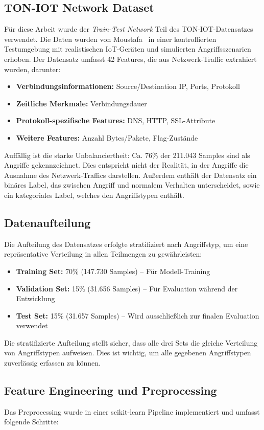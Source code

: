 \documentclass[12pt,oneside]{article}
\begin{document}
	\subsection{TON-IOT Network Dataset}
	Für diese Arbeit wurde der \textit{Train-Test Network} Teil des TON-IOT-Datensatzes verwendet. Die Daten wurden von Moustafa~\cite{moustafa2021} in einer kontrollierten Testumgebung mit realistischen IoT-Geräten und simulierten Angriffsszenarien erhoben. Der Datensatz umfasst 42 Features, die aus Netzwerk-Traffic extrahiert wurden, darunter:
	\begin{itemize}
		\item \textbf{Verbindungsinformationen:} Source/Destination IP, Ports, Protokoll
		\item \textbf{Zeitliche Merkmale:} Verbindungsdauer
		\item \textbf{Protokoll-spezifische Features:} DNS, HTTP, SSL-Attribute
		\item \textbf{Weitere Features:} Anzahl Bytes/Pakete, Flag-Zustände
	\end{itemize}
	Auffällig ist die starke Unbalanciertheit: Ca. 76\% der 211.043 Samples sind als Angriffe gekennzeichnet. Dies entspricht nicht der Realität, in der Angriffe die Ausnahme des  Netzwerk-Traffics darstellen. Außerdem enthält der Datensatz ein binäres Label, das zwischen Angriff und normalem Verhalten unterscheidet, sowie ein kategoriales Label, welches den Angriffstypen enthält. 
	\subsection{Datenaufteilung}
	Die Aufteilung des Datensatzes erfolgte stratifiziert nach Angriffstyp, um eine repräsentative Verteilung in allen Teilmengen zu gewährleisten:
	\begin{itemize}
		\item \textbf{Training Set:} 70\% (147.730 Samples) -- Für Modell-Training
		\item \textbf{Validation Set:} 15\% (31.656 Samples) -- Für Evaluation während der Entwicklung
		\item \textbf{Test Set:} 15\% (31.657 Samples) -- Wird ausschließlich zur finalen Evaluation verwendet
	\end{itemize}
	Die stratifizierte Aufteilung stellt sicher, dass alle drei Sets die gleiche Verteilung von Angriffstypen aufweisen. Dies ist wichtig, um alle gegebenen Angriffstypen zuverlässig erfassen zu können.
	\subsection{Feature Engineering und Preprocessing}
	Das Preprocessing wurde in einer scikit-learn Pipeline implementiert und umfasst folgende Schritte:
\end{document}
